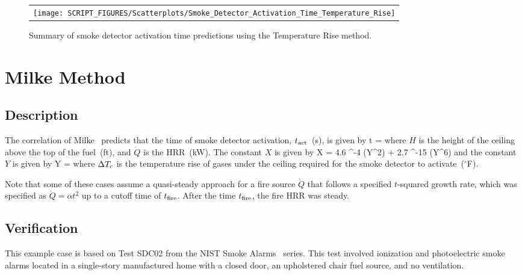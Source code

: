 \begin{figure}[!ht]
\begin{center}
\begin{tabular}{l}
\texttt{[image: SCRIPT\_FIGURES/Scatterplots/Smoke\_Detector\_Activation\_Time\_Temperature\_Rise]}
\end{tabular}
\end{center}
\caption[Summary of smoke detector activation time predictions (Temperature Rise)]
{Summary of smoke detector activation time predictions using the Temperature Rise method.}
\label{Smoke_Detector_Activation_Summary_Temperature_Rise}
\end{figure}


\clearpage


\section{Milke Method}
\label{sec:Milke}

\subsection*{Description}

The correlation of Milke~\cite{Milke:1} predicts that the time of smoke detector activation, $t\sb{act}$~(\si{s}), is given by
\be
t = 
\label{eq:Milke}
\ee
where $H$ is the height of the ceiling above the top of the fuel~(\si{ft}), and $\dot Q$ is the HRR~(\si{kW}). The constant $X$ is given by
\be
X = 4.6 ^{-4} (Y^2) + 2.7 ^{-15} (Y^6)
\label{eq:Milke_X}
\ee
and the constant $Y$ is given by
\be
Y = 
\label{eq:Milke_Y}
\ee
where $\Delta T\sb{c}$ is the temperature rise of gases under the ceiling required for the smoke detector to activate~($^\circ$F).

Note that some of these cases assume a quasi-steady approach for a fire source $\dot Q$ that follows a specified $t$-squared growth rate, which was specified as $\dot Q = \alpha t^2$ up to a cutoff time of $t\sb{fire}$. After the time $t\sb{fire}$, the fire HRR was steady.


\clearpage


\subsection*{Verification}

This example case is based on Test SDC02 from the NIST Smoke Alarms~\cite{Bukowski:1} series. This test involved ionization and photoelectric smoke alarms located in a single-story manufactured home with a closed door, an upholstered chair fuel source, and no ventilation.

